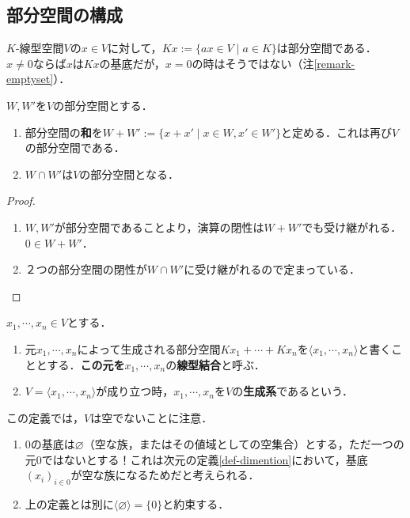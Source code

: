 \documentclass[uplatex, 12pt, dvipdfmx]{jsreport}
\begin{document}
\subsection{部分空間の構成}\label{section-construction-of-subspaces}

\begin{definition}[元が生成する部分空間]
    $K$-線型空間$V$の$x\in V$に対して，$Kx:=\{ax\in V\mid a\in K\}$は部分空間である．
    $x\ne 0$ならば$x$は$Kx$の基底だが，$x=0$の時はそうではない（注\ref{remark-emptyset}）．
\end{definition}

\begin{proposition}
    $W,W'$を$V$の部分空間とする．
    \begin{enumerate}
        \item 部分空間の\textbf{和}を$W+W':=\{x+x'\mid x\in W,x'\in W'\}$と定める．これは再び$V$の部分空間である．
        \item $W\cap  W'$は$V$の部分空間となる．
    \end{enumerate}
\end{proposition}
\begin{proof}
    \begin{enumerate}
        \item $W,W'$が部分空間であることより，演算の閉性は$W+W'$でも受け継がれる．$0\in W+W'$．
        \item ２つの部分空間の閉性が$W\cap W'$に受け継がれるので定まっている．
    \end{enumerate}
\end{proof}

\begin{definition}\label{def-generator}
    $x_1,\cdots,x_n\in V$とする．
    \begin{enumerate}
        \item 元$x_1,\cdots,x_n$によって生成される部分空間$Kx_1+\cdots+Kx_n$を$\langle x_1,\cdots,x_n\rangle$と書くこととする．\textbf{この元を}$x_1,\cdots,x_n$の\textbf{線型結合}と呼ぶ．
        \item $V=\langle x_1,\cdots,x_n\rangle$が成り立つ時，$x_1,\cdots,x_n$を$V$の\textbf{生成系}であるという．
    \end{enumerate}
\end{definition}
\begin{remark}[空集合の場合]\label{remark-emptyset}
    この定義では，$V$は空でないことに注意．
    \begin{enumerate}
        \item $0$の基底は$\varnothing$（空な族，またはその値域としての空集合）とする，ただ一つの元$0$ではないとする！これは次元の定義\ref{def-dimention}において，基底$(x_i)_{i\in 0}$が空な族になるためだと考えられる．
        \item 上の定義とは別に$\langle\varnothing\rangle=\{0\}$と約束する．
    \end{enumerate}
\end{remark}
\end{document}
